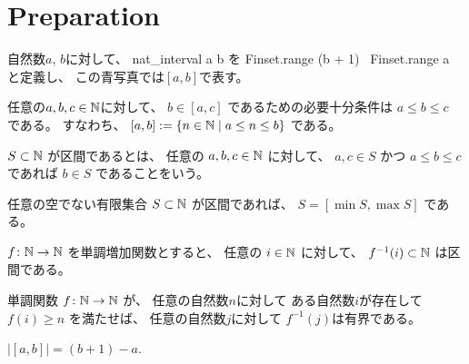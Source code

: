 \chapter{Preparation}

\begin{definition}
\label{df:nat_interval}
\leanok
自然数$a$, $b$に対して、
\textsf{nat\_interval a b}
を
\textsf{Finset.range (b + 1) \ Finset.range a}
と定義し、
この青写真では$[a,b]$で表す。
\end{definition}

\begin{lemma}
\label{lm:nat_interval_mem}
\leanok
任意の$a,b,c \in \mathbb{N}$に対して、
$
b \in [a, c]
$
であるための必要十分条件は
$
a \le b \le c
$
である。
すなわち、
$
[a, b] := \{n \in \mathbb{N} \mid a \le n \le b\}
$
である。
\end{lemma}

\begin{definition}
\label{df:IsInterval}
\leanok
$
S \subset \mathbb{N}
$
が区間であるとは、
任意の
$
a, b, c \in \mathbb{N}
$
に対して、
$
a, c \in S
$
かつ
$
a \le b \le c
$
であれば
$
b \in S
$
であることをいう。
\end{definition}

\begin{lemma}
\label{lm:nonempty_interval_range}
\leanok
任意の空でない有限集合
$
S \subset \mathbb{N}
$
が区間であれば、
$
S = [\min S, \max S]
$
である。
\end{lemma}

\begin{lemma}
\label{lm:preimage_of_monotone_isInterval}
\leanok
$
f \colon \mathbb{N} \to \mathbb{N}
$
を単調増加関数とすると、
任意の
$
i \in \mathbb{N}
$
に対して、
$
f^{-1}(i) \subset \mathbb{N}
$
は区間である。
\end{lemma}

\begin{lemma}
単調関数
$
f \colon \mathbb{N} \to \mathbb{N}
$
が、
任意の自然数$n$に対して
ある自然数$i$が存在して
$
f(i) \ge n
$
を満たせば、
任意の自然数$j$に対して
$f^{-1}(j)$は有界である。
\end{lemma}

\begin{lemma}
\label{lm:nat_interval_card}
\leanok
$
|[a,b]| = (b+1) - a
$.
\end{lemma}

